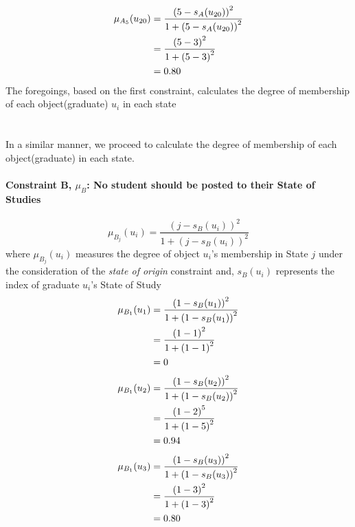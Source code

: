 \documentclass[a4paper]{book}
\begin{document}
				\begin{align}
					\mu_{A_5}(u_{20}) &= \frac{\left(5-s_A(u_{20})\right)^2}{1 + \left(5-s_A(u_{20})\right)^2}\\
					&= \frac{\left(5-3\right)^2}{1 + \left(5-3\right)^2} \notag \\
					&= 0.80 \notag
				\end{align}
			The foregoings, based on the first constraint, calculates the degree of membership of each object(graduate) $u_i$ in each state
			\\
			\\
			\\
			In a similar manner, we proceed to calculate the degree of membership of each object(graduate) in each state.
			\paragraph{Constraint B, $\mu_B$: No student should be posted to their State of Studies}
				\begin{equation}
					\mu_{B_j}(u_i) = \frac{\left(j-s_B(u_i)\right)^2}{1 + \left(j-s_B(u_i)\right)^2}
				\end{equation}
				where $\mu_{B_j}(u_i)$ measures the degree of object $u_i$'s membership in State $j$ under the consideration of the \textit{state of origin} constraint and,
				$s_B(u_i)$ represents the index of graduate $u_i$'s State of Study\\
				\begin{align}
					\mu_{B_1}(u_1) &= \frac{\left(1-s_B(u_1)\right)^2}{1 + \left(1-s_B(u_1)\right)^2}\\
					&= \frac{\left(1-1\right)^2}{1 + \left(1-1\right)^2} \notag \\
					&= 0 \notag
				\end{align}
				\begin{align}
					\mu_{B_1}(u_2) &= \frac{\left(1-s_B(u_2)\right)^2}{1 + \left(1-s_B(u_2)\right)^2}\\
					&= \frac{\left(1-2\right)^5}{1 + \left(1-5\right)^2} \notag \\
					&= 0.94 \notag
				\end{align}
				\begin{align}
					\mu_{B_1}(u_3) &= \frac{\left(1-s_B(u_3)\right)^2}{1 + \left(1-s_B(u_3)\right)^2}\\
					&= \frac{\left(1-3\right)^2}{1 + \left(1-3\right)^2} \notag \\
					&= 0.80 \notag
				\end{align}
\end{document}
